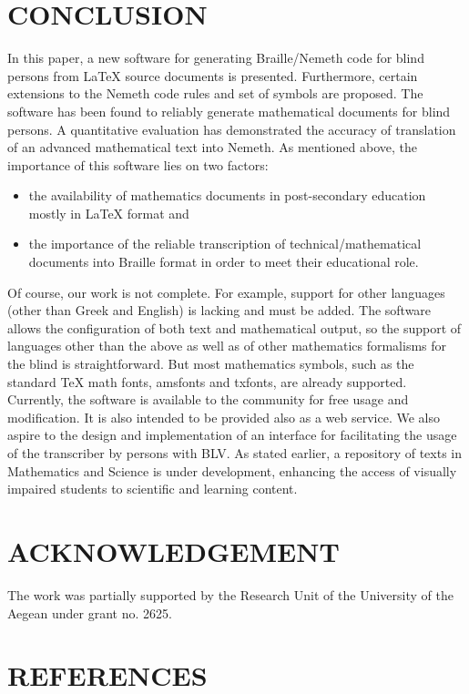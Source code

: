 \documentclass[11.5pt]{sig-alternate} %
\begin{document}
\begin{large}
\section*{CONCLUSION}

In this paper, a new software for generating Braille/Nemeth code for blind persons from LaTeX source documents is presented. Furthermore, certain extensions to the Nemeth code rules and set of symbols are proposed. The software has been found to reliably generate mathematical documents for blind persons. A quantitative evaluation has demonstrated the accuracy of translation of an advanced mathematical text into Nemeth. As mentioned above, the importance of this software lies on two factors:
\begin{itemize}
    \item 	the availability of mathematics documents in post-secondary education mostly in LaTeX format and
    \item 	the importance of the reliable transcription of technical/mathematical documents into Braille format in order to meet their educational role.
\end{itemize}
Of course, our work is not complete. For example, support for other languages (other than Greek and English) is lacking and must be added. The software allows the configuration of both text and mathematical output, so the support of languages other than the above as well as of other mathematics formalisms for the blind is straightforward. But most mathematics symbols, such as the standard TeX math fonts, amsfonts and txfonts, are already supported. Currently, the software is available to the community for free usage and modification. It is also intended to be provided also as a web service. We also aspire to the design and implementation of an interface for facilitating the usage of the transcriber by persons with BLV. As stated earlier, a repository of texts in Mathematics and Science is under development, enhancing the access of visually impaired students to scientific and learning content.

\section*{ACKNOWLEDGEMENT}

The work was partially supported by the Research Unit of the University of the Aegean under grant no. 2625.

\end{large}
\clearpage
\section*{REFERENCES}\par 
\end{document}
